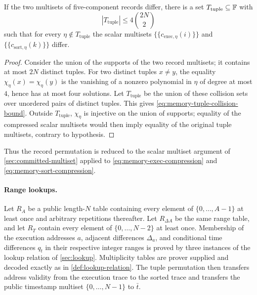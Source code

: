 \begin{lemma}
\label{lem:memory-tuple-compression}
If the two multisets of five-component records differ, there is a set $T_{\mathrm{tuple}}\subseteq\mathbb{F}$ with
\begin{equation}
  |T_{\mathrm{tuple}}|
  \le
  4\binom{2N}{2}
  \label{eq:memory-tuple-collision-bound}
\end{equation}
such that for every $\eta\notin T_{\mathrm{tuple}}$ the scalar multisets
$\{\!\{c_{\mathrm{exec},\eta}(i)\}\!\}$ and
$\{\!\{c_{\mathrm{sort},\eta}(k)\}\!\}$ differ.
\end{lemma}

\begin{proof}
Consider the union of the supports of the two record multisets; it contains at most $2N$ distinct tuples.  For two distinct tuples $x\ne y$, the equality $\chi_\eta(x)=\chi_\eta(y)$ is the vanishing of a nonzero polynomial in $\eta$ of degree at most $4$, hence has at most four solutions.  Let $T_{\mathrm{tuple}}$ be the union of these collision sets over unordered pairs of distinct tuples.  This gives \eqref{eq:memory-tuple-collision-bound}.  Outside $T_{\mathrm{tuple}}$, $\chi_\eta$ is injective on the union of supports; equality of the compressed scalar multisets would then imply equality of the original tuple multisets, contrary to hypothesis.
\end{proof}

Thus the record permutation is reduced to the scalar multiset argument of \cref{sec:committed-multiset} applied to \eqref{eq:memory-exec-compression} and \eqref{eq:memory-sort-compression}.

\paragraph{Range lookups.}
Let $R_A$ be a public length-$N$ table containing every element of $\{0,\ldots,A-1\}$ at least once and arbitrary repetitions thereafter.  Let $R_{\Delta A}$ be the same range table, and let $R_T$ contain every element of $\{0,\ldots,N-2\}$ at least once.  Membership of the execution addresses $a$, adjacent differences $\Delta_a$, and conditional time differences $q_t$ in their respective integer ranges is proved by three instances of the lookup relation of \cref{sec:lookup}.  Multiplicity tables are prover supplied and decoded exactly as in \cref{def:lookup-relation}.  The tuple permutation then transfers address validity from the execution trace to the sorted trace and transfers the public timestamp multiset $\{0,\ldots,N-1\}$ to $\bar t$.

